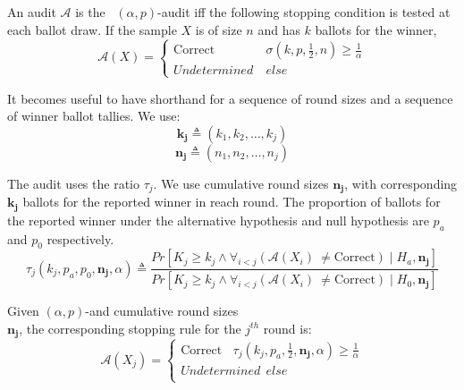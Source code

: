 \begin{definition}\label{def:bravo}  An audit $\mathcal{A}$ is the \B~$(\alpha, p)$-\BRAVO audit iff the following stopping condition is tested at each ballot draw. If the sample $X$ is of size $n$ and has $k$ ballots for the winner,  
\begin{equation}
    \mathcal{A}(X) =  \left\{ \begin{array}{ll} \text{Correct} & ~\sigma(k, p, \frac{1}{2}, n) 
        \geq \frac{1}{\alpha}\\
        Undetermined & ~else 
    \end{array}
    \right .
    \label{eqn:bravo}
\end{equation}
\end{definition}

It becomes useful to have shorthand for a sequence of round sizes and a sequence
of winner ballot tallies.
We use:
$$\bm{k_j}\triangleq(k_1,k_2,\ldots,k_j)$$
$$\bm{n_j}\triangleq(n_1,n_2,\ldots,n_j)$$

\begin{definition} \label{def:minerva_ratio} The \R \Minerva audit uses the ratio $\tau_j$. We use cumulative round sizes $\bm{n_j}$, with corresponding $\bm{k_j}$ ballots for the reported winner in reach round. The proportion of ballots for the reported winner under the alternative hypothesis and null hypothesis are $p_a$ and $p_0$ respectively.
         \begin{equation}
             \label{eqn:tau}
                 \tau_{j}(k_{j}, p_a,p_0, \bm{n_j}, \alpha )  \triangleq
                 \frac{Pr[K_{j} \geq k_{j} \wedge \forall_{i < j} ({\mathcal{A}}(X_i) ~\neq \text{Correct}) \mid H_a, \bm{n_j}]}{Pr[K_{j} \geq k_{j} \wedge \forall_{i < j} ({\mathcal{A}}(X_i) ~\neq \text{Correct}) \mid H_0, \bm{n_j}]}
         \end{equation}
\end{definition}

\begin{definition}
     \label{def:minerva}
     Given \B $(\alpha, p)$-\BRAVO and cumulative round sizes\\ $\bm{n_j}$, the corresponding \R \Minerva stopping rule for the $j^{th}$ round is:
 \begin{equation}
     \mathcal{A}(X_{j})=  \left\{ \begin{array}{ll} \text{Correct} ~~~~ \tau_{j}(k_{j}, p_a, \frac{1}{2}, \bm{n_j}, \alpha ) \geq \frac{1}{\alpha}\\
             Undetermined ~~else \\
         \end{array}
         \right .
         \label{eqn:minerva-test}
 \end{equation}
\end{definition}
